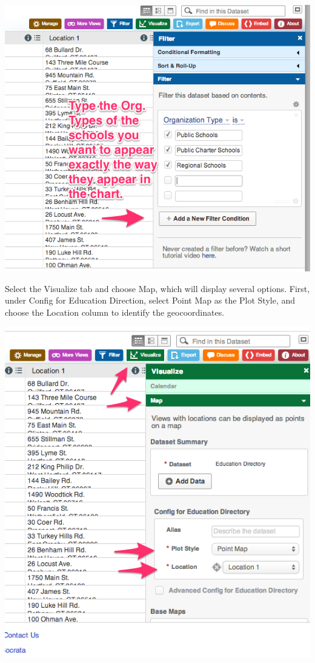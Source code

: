 \documentclass[
  english,
]{book}
\begin{document}
\includegraphics{images/06-map/SocrataMap4.png}

Select the Visualize tab and choose Map, which will display several options. First, under Config for Education Direction, select Point Map as the Plot Style, and choose the Location column to identify the geocoordinates.

\includegraphics{images/06-map/SocrataMap5.png}
\end{document}
